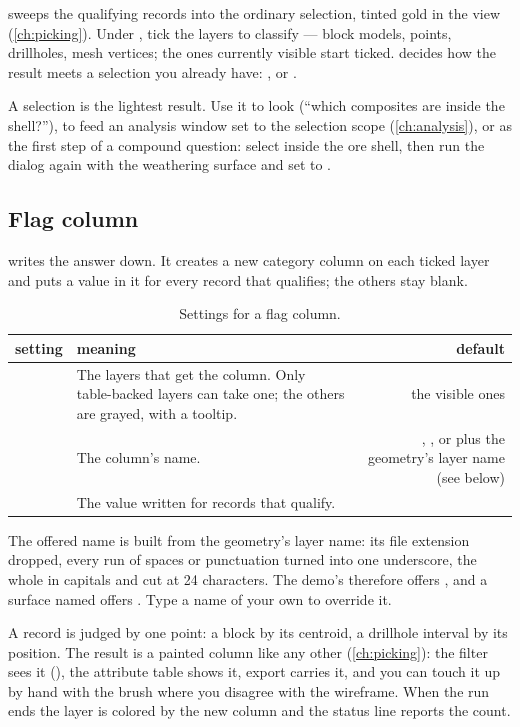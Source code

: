  sweeps the qualifying records into the ordinary selection, tinted gold in the view (\cref{ch:picking}). Under , tick the layers to classify — block models, points, drillholes, mesh vertices; the ones currently visible start ticked.  decides how the result meets a selection you already have: ,  or .

A selection is the lightest result. Use it to look (“which composites are inside the shell?”), to feed an analysis window set to the selection scope (\cref{ch:analysis}), or as the first step of a compound question: select inside the ore shell, then run the dialog again with  the weathering surface and  set to .

\subsection{Flag column}

 writes the answer down. It creates a new category column on each ticked layer and puts a value in it for every record that qualifies; the others stay blank.

\begin{table}[htbp]\small
\begin{tabularx}{\linewidth}{@{}lMD@{}}\toprule
setting & meaning & default \\ \midrule
{} & The layers that get the column. Only table-backed layers can take one; the others are grayed, with a tooltip. & the visible ones \\
 & The column's name. & , ,  or  plus the geometry's layer name (see below) \\
 & The value written for records that qualify. &  \\ \bottomrule
\end{tabularx}
\caption{Settings for a flag column.}\label{tab:geometry-flag}
\end{table}

The offered name is built from the geometry's layer name: its file extension dropped, every run of spaces or punctuation turned into one underscore, the whole in capitals and cut at 24 characters. The demo's  therefore offers , and a surface named  offers . Type a name of your own to override it.

A record is judged by one point: a block by its centroid, a drillhole interval by its position. The result is a painted column like any other (\cref{ch:picking}): the filter sees it (), the attribute table shows it, export carries it, and you can touch it up by hand with the brush where you disagree with the wireframe. When the run ends the layer is colored by the new column and the status line reports the count.

